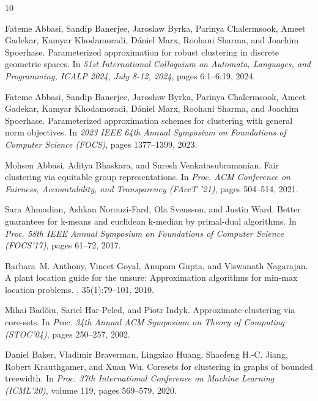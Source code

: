 \documentclass[11pt]{article}
\begin{document}
 
 \begin{thebibliography}{10}

Fateme Abbasi, Sandip Banerjee, Jaroslaw Byrka, Parinya Chalermsook, Ameet Gadekar, Kamyar Khodamoradi, D{\'{a}}niel Marx, Roohani Sharma, and Joachim Spoerhase.
\newblock Parameterized approximation for robust clustering in discrete geometric spaces.
\newblock In {\em 51st International Colloquium on Automata, Languages, and Programming, {ICALP} 2024, July 8-12, 2024}, pages 6:1--6:19, 2024.

Fateme Abbasi, Sandip Banerjee, Jarosław Byrka, Parinya Chalermsook, Ameet Gadekar, Kamyar Khodamoradi, Dániel Marx, Roohani Sharma, and Joachim Spoerhase.
\newblock Parameterized approximation schemes for clustering with general norm objectives.
\newblock In {\em 2023 IEEE 64th Annual Symposium on Foundations of Computer Science (FOCS)}, pages 1377--1399, 2023.

Mohsen Abbasi, Aditya Bhaskara, and Suresh Venkatasubramanian.
\newblock Fair clustering via equitable group representations.
\newblock In {\em Proc. {ACM} Conference on Fairness, Accountability, and Transparency (FAccT '21)}, pages 504--514, 2021.

Sara Ahmadian, Ashkan Norouzi{-}Fard, Ola Svensson, and Justin Ward.
\newblock Better guarantees for k-means and euclidean k-median by primal-dual algorithms.
\newblock In {\em Proc. 58th {IEEE} Annual Symposium on Foundations of Computer Science (FOCS'17)}, pages 61--72, 2017.

Barbara~M. Anthony, Vineet Goyal, Anupam Gupta, and Viswanath Nagarajan.
\newblock A plant location guide for the unsure: Approximation algorithms for min-max location problems.
, 35(1):79--101, 2010.

Mihai Bad\u{o}iu, Sariel Har{-}Peled, and Piotr Indyk.
\newblock Approximate clustering via core-sets.
\newblock In {\em Proc. 34th Annual {ACM} Symposium on Theory of Computing (STOC'04)}, pages 250--257, 2002.

Daniel Baker, Vladimir Braverman, Lingxiao Huang, Shaofeng H.-C. Jiang, Robert Krauthgamer, and Xuan Wu.
\newblock Coresets for clustering in graphs of bounded treewidth.
\newblock In {\em Proc. 37th International Conference on Machine Learning (ICML'20)}, volume 119, pages 569--579, 2020.


\end{thebibliography}
\end{document}
